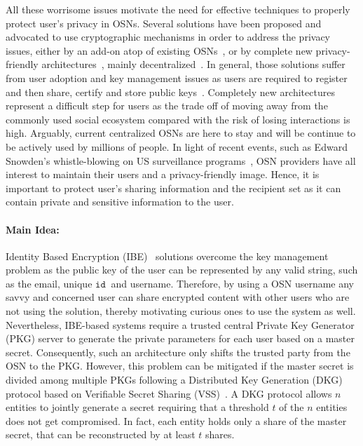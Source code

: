 \documentclass{llncs}
\newcommand{\id}[1]{\ensuremath{\mathtt{id}_{#1}}}
\begin{document}
All these worrisome issues motivate the need for effective techniques to properly protect user's privacy in OSNs. Several solutions have been proposed and advocated to use cryptographic mechanisms in order to address the privacy issues, either by an add-on atop of existing OSNs~\cite{BadenPersona,BeatoScramble,Guha:2008,Luo:2009}, or by complete new privacy-friendly architectures~\cite{DBLP:conf/sp/CristofaroSTW12}, mainly decentralized~\cite{DBLP:conf/wowmom/CutilloMO11,NYT2010.Diaspora}. In general, those solutions suffer from user adoption and key management issues as users are required to register and then share, certify and store public keys~\cite{article2400}. Completely new architectures represent a difficult step for users as the trade off of moving away from the commonly used social ecosystem compared with the risk of losing interactions is high. Arguably, current centralized OSNs are here to stay and will be continue to be actively used by millions of people. In light of recent events, such as Edward Snowden's whistle-blowing on US surveillance programs~\cite{prism}, OSN providers have all interest to maintain their users and a privacy-friendly image. Hence, it is important to protect user's sharing information and the recipient set as it can contain private and sensitive information to the user. 


\paragraph{Main Idea:}

Identity Based Encryption (IBE)~\cite{DBLP:conf/crypto/Shamir84} solutions overcome the key management problem as the public key of the user can be represented by any valid string, such as the email, unique \id{}\ and username. Therefore, by using a OSN username any savvy and concerned user can share encrypted content with other users who are not using the solution, thereby motivating curious ones to use the system as well. Nevertheless, IBE-based systems require a trusted central Private Key Generator (PKG) server to generate the private parameters for each user based on a master secret. Consequently, such an architecture only shifts the trusted party from the OSN to the PKG. However, this problem can be mitigated if the master secret is divided among multiple PKGs following a Distributed Key Generation (DKG)~\cite{Pedersen:1991:NIS:646756.705507} protocol based on Verifiable Secret Sharing (VSS)~\cite{DBLP:conf/focs/ChorGMA85}. A DKG protocol allows $n$ entities to jointly generate a secret requiring that a threshold $t$ of the $n$ entities does not get compromised. In fact, each entity holds only a share of the master secret, that can be reconstructed by at least $t$ shares. 
\end{document}
